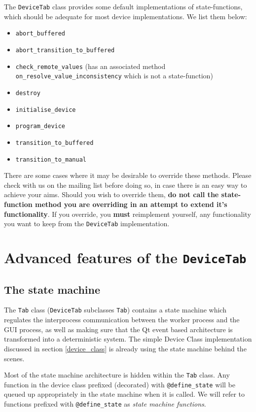 \documentclass[12pt]{article}
\begin{document}
The \texttt{DeviceTab} class provides some default implementations of state-functions, which should be adequate for most device implementations.
We list them below:

\begin{itemize}
\item \texttt{abort\_buffered}
\item \texttt{abort\_transition\_to\_buffered}
\item \texttt{check\_remote\_values} (has an associated method \texttt{on\_resolve\_value\_inconsistency} which is not a state-function)
\item \texttt{destroy}
\item \texttt{initialise\_device}
\item \texttt{program\_device}
\item \texttt{transition\_to\_buffered}
\item \texttt{transition\_to\_manual}
\end{itemize}

There are some cases where it may be desirable to override these methods.
Please check with us on the mailing list before doing so, in case there is an easy way to achieve your aims.
Should you wish to override them, \textbf{do not call the state-function method you are overriding in an attempt to extend it's functionality}.
If you override, you \textbf{must} reimplement yourself, any functionality you want to keep from the \texttt{DeviceTab} implementation.





\newpage
\section{Advanced features of the \texttt{DeviceTab}}
\subsection{The state machine}\label{device_class_state_machine}
The \texttt{Tab} class (\texttt{DeviceTab} subclasses \texttt{Tab}) contains a state machine which regulates the interprocess communication between the worker process and the GUI process, as well as making sure that the Qt event based architecture is transformed into a deterministic system. 
The simple Device Class implementation discussed in section \ref{device_class} is already using the state machine behind the scenes.

Most of the state machine architecture is hidden within the \texttt{Tab} class. 
Any function in the device class prefixed (decorated) with \texttt{@define\_state} will be queued up appropriately in the state machine when it is called.
We will refer to functions prefixed with \texttt{@define\_state} as \textit{state machine functions}.
\end{document}
